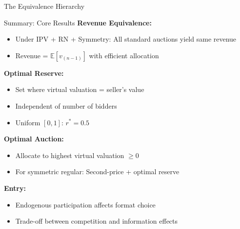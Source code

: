 \documentclass[xcolor={x11names}, aspectratio=169 ]{beamer}
\newcommand{\E}{\mathbb{E}}
\begin{document}
\begin{frame}{The Equivalence Hierarchy}
\begin{center}
\end{center}
\end{frame}

\begin{frame}{Summary: Core Results}
\textbf{Revenue Equivalence:}
\begin{itemize}
  \item Under IPV + RN + Symmetry: All standard auctions yield same revenue
  \item Revenue = $\E[v_{(n-1)}]$ with efficient allocation
\end{itemize}

\textbf{Optimal Reserve:}
\begin{itemize}
  \item Set where virtual valuation = seller's value
  \item Independent of number of bidders
  \item Uniform $[0,1]$: $r^* = 0.5$
\end{itemize}

\textbf{Optimal Auction:}
\begin{itemize}
  \item Allocate to highest virtual valuation $\geq 0$
  \item For symmetric regular: Second-price + optimal reserve
\end{itemize}

\textbf{Entry:}
\begin{itemize}
  \item Endogenous participation affects format choice
  \item Trade-off between competition and information effects
\end{itemize}
\end{frame}
\end{document}
